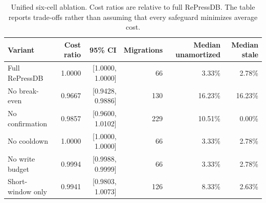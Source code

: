 \begin{table}[t]
\centering
\caption{Unified six-cell ablation. Cost ratios are relative to full RePressDB. The table reports trade-offs rather than assuming that every safeguard minimizes average cost.}
\label{tab:unified_ablation}
\begin{tabular}{@{}lrrrrr@{}}
\toprule
Variant & Cost ratio & 95\% CI & Migrations & Median unamortized & Median stale \\
\midrule
Full RePressDB & 1.0000 & [1.0000, 1.0000] & 66 & 3.33\% & 2.78\% \\
No break-even & 0.9667 & [0.9428, 0.9886] & 130 & 16.23\% & 16.23\% \\
No confirmation & 0.9857 & [0.9600, 1.0102] & 229 & 10.51\% & 0.00\% \\
No cooldown & 1.0000 & [1.0000, 1.0000] & 66 & 3.33\% & 2.78\% \\
No write budget & 0.9994 & [0.9988, 0.9999] & 66 & 3.33\% & 2.78\% \\
Short-window only & 0.9941 & [0.9803, 1.0073] & 126 & 8.33\% & 2.63\% \\
\bottomrule
\end{tabular}
\end{table}
